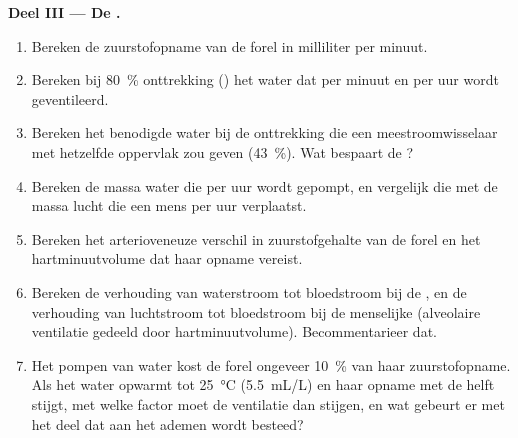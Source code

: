 \begin{problem}
\medskip
\noindent\textbf{Deel III --- De .}
\begin{enumerate}[resume]
  \item Bereken de zuurstofopname van de forel in milliliter per minuut.
  \item Bereken bij \qty{80}{\%} onttrekking () het water dat
        per minuut en per uur wordt geventileerd.
  \item Bereken het benodigde water bij de onttrekking die een
        meestroomwisselaar met hetzelfde oppervlak zou geven
        (\qty{43}{\%}). Wat bespaart de ?
  \item Bereken de massa water die per uur wordt gepompt, en vergelijk die
        met de massa lucht die een mens per uur verplaatst.
  \item Bereken het arterioveneuze verschil in zuurstofgehalte van de forel
        en het hartminuutvolume dat haar opname vereist.
  \item Bereken de verhouding van waterstroom tot bloedstroom bij de
        , en de verhouding van luchtstroom tot bloedstroom bij de
        menselijke  (alveolaire ventilatie gedeeld door
        hartminuutvolume). Becommentarieer dat.
  \item Het pompen van water kost de forel ongeveer \qty{10}{\%} van haar
        zuurstofopname. Als het water opwarmt tot \qty{25}{\celsius}
        (\qty{5.5}{mL/L}) en haar opname met de helft stijgt, met welke
        factor moet de ventilatie dan stijgen, en wat gebeurt er met het
        deel dat aan het ademen wordt besteed?
\end{enumerate}


\end{problem}
